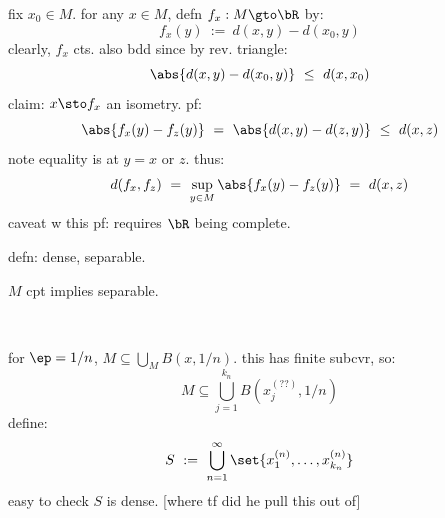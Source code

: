 fix $x_{0}\in M$. for any $x\in M$, defn $f_{x}:M\gto\bR$ by:
\begin{equation*}
    f_{x}(y) \ := \ d(x,y)-d(x_{0},y)
\end{equation*}
clearly, $f_{x}$ cts. also bdd since by rev. triangle:
\begin{equation*}
    \abs{d(x,y)-d(x_{0},y)} \ \leq \ d(x,x_{0})
\end{equation*}
claim: $x\sto f_{x}$ an isometry. pf:
\begin{equation*}
    \abs{f_{x}(y)-f_{z}(y)} \ = \ \abs{d(x,y)-d(z,y)} \ \leq \ d(x,z)
\end{equation*}
note equality is at $y=x$ or $z$. thus:
\begin{equation*}
    d(f_{x},f_{z}) \ = \ \sup_{y\in M}\abs{f_{x}(y)-f_{z}(y)} \ = \ d(x,z)
\end{equation*}
caveat w this pf: requires $\bR$ being complete.

\newpage
defn: dense, separable.
\begin{lm}
	$M$ cpt implies separable.
\end{lm} \

\begin{pf}[source=Primary Source Material]
    for $\ep=1/n$, $M\subseteq\bigcup_{M}B(x,1/n)$.
	this has finite subcvr, so:
	\begin{equation*}
	    M \subseteq \bigcup_{j=1}^{k_{n}}B(x_{j}^{(??)},1/n)
	\end{equation*}
	define:
	\begin{equation*}
	    S \ := \ \bigcup_{n=1}^{\infty}\set{x_{1}^{(n)},\dots,x_{k_{n}}^{(n)}}
	\end{equation*}
	easy to check $S$ is dense. [where tf did he pull this out of]
\end{pf}



